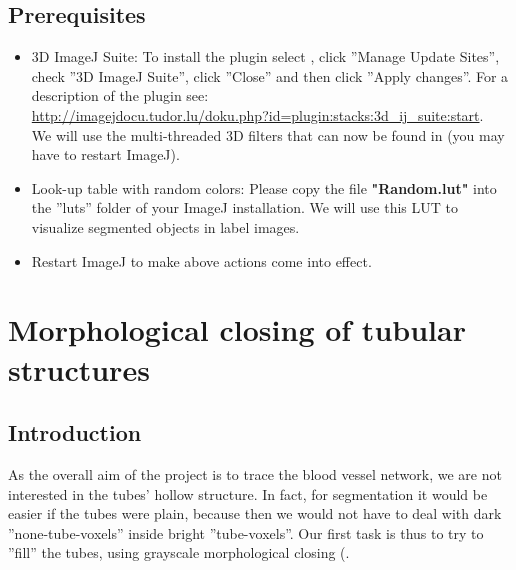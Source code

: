 \subsection{Prerequisites}
\label{sec:mod8prereq}
%
%

\begin{itemize}
\item 3D ImageJ Suite: To install the plugin select , click ''Manage Update Sites'', check ''3D ImageJ Suite'', click ''Close'' and then click ''Apply changes''.
For a description of the plugin see:\\
\url{http://imagejdocu.tudor.lu/doku.php?id=plugin:stacks:3d\_ij\_suite:start}.\\
We will use the multi-threaded 3D filters that can now be found in  (you may have to restart ImageJ).\\

\item Look-up table with random colors: Please copy the file \textbf{"Random.lut"} into the ''luts'' folder of your ImageJ installation. We will use this LUT to visualize segmented objects in label images.

\item Restart ImageJ to make above actions come into effect.
\end{itemize}
%

\section{Morphological closing of tubular structures}
%
\subsection{Introduction}
As the overall aim of the project is to trace the blood vessel network, we are not interested in the tubes' hollow structure. In fact, for segmentation it would be easier if the tubes were plain, because then we would not have to deal with dark ''none-tube-voxels'' inside bright ''tube-voxels''. Our first task is thus to try to ''fill'' the tubes, using grayscale morphological closing (\cite{vincent1993morphological}.
%
